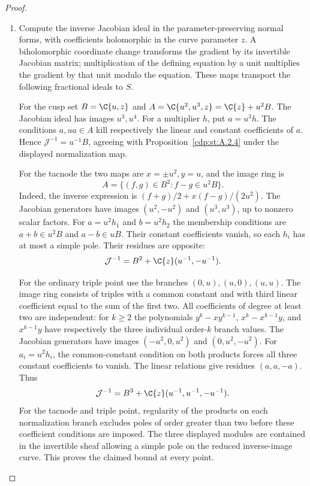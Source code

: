 \begin{proof}
\begin{enumerate}[label={$\langle1\rangle$\arabic*.},leftmargin=*]
\item Compute the inverse Jacobian ideal in the parameter-preserving
normal forms, with coefficients holomorphic in the curve parameter $z$.
A biholomorphic coordinate change transforms the gradient by its
invertible Jacobian matrix; multiplication of the defining equation
by a unit multiplies the gradient by that unit modulo the equation.
These maps transport the following fractional ideals to $S$.

For the cusp set $B=\C\{u,z\}$ and
$A=\C\{u^2,u^3,z\}=\C\{z\}+u^2B$.
The Jacobian ideal has images $u^3,u^4$. For a multiplier $h$, put
$a=u^3h$. The conditions $a,ua\in A$ kill respectively the linear
and constant coefficients of $a$. Hence
$\mathcal J^{-1}=u^{-1}B$, agreeing with
Proposition~\ref{cdp:st:A.2.4} under the displayed normalization map.

For the tacnode the two maps are $x=\pm u^2,y=u$, and the image ring is
\[
 A=\{(f,g)\in B^2:f-g\in u^2B\}.
\]
Indeed, the inverse expression is
$(f+g)/2+x(f-g)/(2u^2)$. The Jacobian generators have images
$(u^2,-u^2)$ and $(u^3,u^3)$, up to nonzero scalar factors.
For $a=u^2h_1$ and $b=u^2h_2$ the membership conditions are
$a+b\in u^2B$ and $a-b\in uB$. Their constant coefficients vanish,
so each $h_i$ has at most a simple pole. Their residues are opposite:
\[
 \mathcal J^{-1}=B^2+\C\{z\}(u^{-1},-u^{-1}).
\]

For the ordinary triple point use the branches
$(0,u),(u,0),(u,u)$. The image ring consists of triples with a common
constant and with third linear coefficient equal to the sum of the
first two. All coefficients of degree at least two are independent:
for $k\ge2$ the polynomials
$y^k-xy^{k-1}$, $x^k-x^{k-1}y$, and $x^{k-1}y$ have respectively
the three individual order-$k$ branch values.
The Jacobian generators have images
$(-u^2,0,u^2)$ and $(0,u^2,-u^2)$.
For $a_i=u^2h_i$, the common-constant condition on both products forces
all three constant coefficients to vanish. The linear relations
give residues $(a,a,-a)$. Thus
\[
 \mathcal J^{-1}=B^3+\C\{z\}(u^{-1},u^{-1},-u^{-1}).
\]
For the tacnode and triple point, regularity of the products on each
normalization branch excludes poles of order greater than two before
these coefficient conditions are imposed. The three displayed modules are contained in the
invertible sheaf allowing a simple pole on the reduced inverse-image
curve. This proves the claimed bound at every point.

\end{enumerate}
\end{proof}